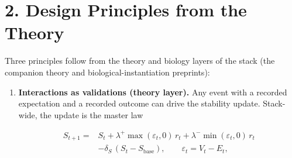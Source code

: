 \documentclass[11pt,twocolumn]{article}
\begin{document}
\FloatBarrier
\section*{2. Design Principles from the
Theory}

Three principles follow from the theory and biology layers of the stack (the companion theory and biological-instantiation preprints):

\begin{enumerate}
\def\labelenumi{\arabic{enumi}.}
\item
  \textbf{Interactions as validations (theory layer).} Any event with a recorded
  expectation and a recorded outcome can drive the stability update.
  Stack-wide, the update is the master law

  \begin{equation}\begin{split} S_{t+1} ={}& S_t + \lambda^{+}\max(\varepsilon_t, 0)\,r_t + \lambda^{-}\min(\varepsilon_t, 0)\,r_t \\ & - \delta_S\,(S_t - S_{\mathrm{base}}), \qquad \varepsilon_t = V_t - E_t, \end{split}\label{eq:master} \end{equation}


\end{enumerate}
\end{document}
